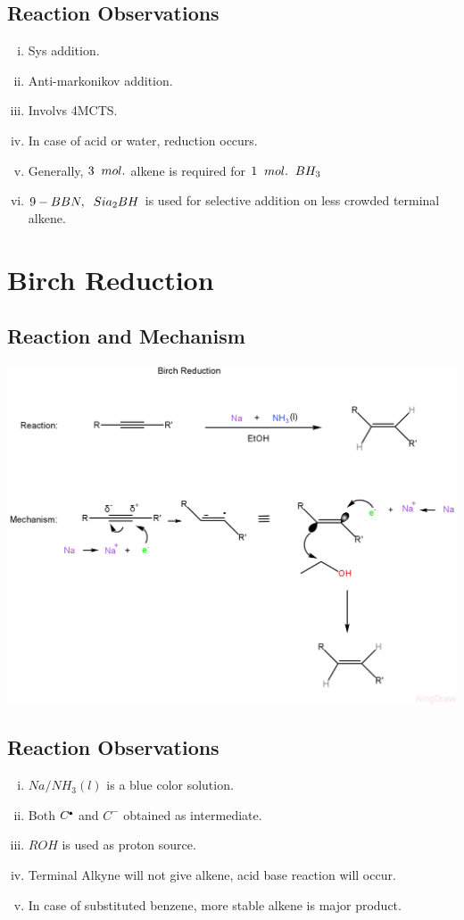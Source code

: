 \documentclass{article}
\newcommand*\fullcirc[1][0.3ex]{\tikz\fill (0,0) circle (#1);}
\begin{document}
\subsection{Reaction Observations}
\begin{enumerate}[i.]
    \item Sys addition.
    \item Anti-markonikov addition.
    \item Involvs 4MCTS.
    \item In case of acid or water, reduction occurs.
    \item Generally, $3 \hspace{2mm} mol.$ alkene is required for $1 \hspace{2mm} mol. \hspace{2mm} BH_{3} $
    \item $9-BBN, \hspace{2mm}Sia_{2}BH$ is used for selective addition on less crowded terminal alkene.
\end{enumerate}

\section{Birch Reduction}
\subsection{Reaction and Mechanism}
\includegraphics[scale=0.25]{birch_1722686860261.JPEG}
\subsection{Reaction Observations}
\begin{enumerate}[i.]
    \item $Na/ NH_{3}(l)$ is a blue color solution.
    \item Both $C^{\fullcirc}$ and $C^-$ obtained as intermediate.
    \item $ROH$ is used as proton source.
    \item Terminal Alkyne will not give alkene, acid base reaction will occur.
    \item In case of substituted benzene, more stable alkene is major product.
\end{enumerate}
\end{document}

